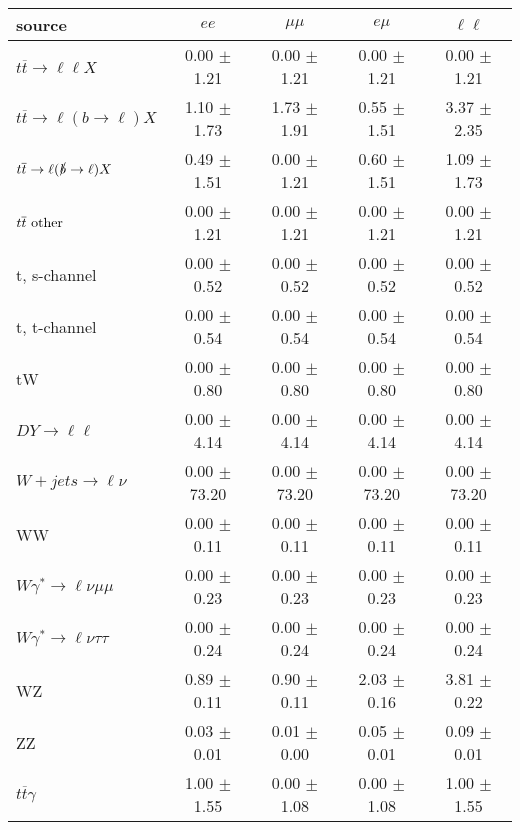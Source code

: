 \begin{tabular}{l|cccc} \hline\hline
source & $ee$ & $\mu\mu$ & $e\mu$ & $\ell\ell $ \\
\hline
$t\overline{t} \rightarrow \ell \ell X$ &  0.00 $\pm$  1.21 &  0.00 $\pm$  1.21 &  0.00 $\pm$  1.21 &  0.00 $\pm$  1.21 \\
$t\overline{t} \rightarrow \ell (b \rightarrow \ell) X$ &  1.10 $\pm$  1.73 &  1.73 $\pm$  1.91 &  0.55 $\pm$  1.51 &  3.37 $\pm$  2.35 \\
$t\overline{t} \rightarrow \ell (\slashed b \rightarrow \ell) X$ &  0.49 $\pm$  1.51 &  0.00 $\pm$  1.21 &  0.60 $\pm$  1.51 &  1.09 $\pm$  1.73 \\
        $t\overline{t}\ \rm{other}$ &  0.00 $\pm$  1.21 &  0.00 $\pm$  1.21 &  0.00 $\pm$  1.21 &  0.00 $\pm$  1.21 \\
\hline
                       t, s-channel &  0.00 $\pm$  0.52 &  0.00 $\pm$  0.52 &  0.00 $\pm$  0.52 &  0.00 $\pm$  0.52 \\
                       t, t-channel &  0.00 $\pm$  0.54 &  0.00 $\pm$  0.54 &  0.00 $\pm$  0.54 &  0.00 $\pm$  0.54 \\
                                 tW &  0.00 $\pm$  0.80 &  0.00 $\pm$  0.80 &  0.00 $\pm$  0.80 &  0.00 $\pm$  0.80 \\
\hline
         $DY \rightarrow \ell \ell$ &  0.00 $\pm$  4.14 &  0.00 $\pm$  4.14 &  0.00 $\pm$  4.14 &  0.00 $\pm$  4.14 \\
      $W+jets \rightarrow \ell \nu$ &  0.00 $\pm$ 73.20 &  0.00 $\pm$ 73.20 &  0.00 $\pm$ 73.20 &  0.00 $\pm$ 73.20 \\
                                 WW &  0.00 $\pm$  0.11 &  0.00 $\pm$  0.11 &  0.00 $\pm$  0.11 &  0.00 $\pm$  0.11 \\
\hline
$W\gamma^{*} \rightarrow \ell \nu \mu\mu$ &  0.00 $\pm$  0.23 &  0.00 $\pm$  0.23 &  0.00 $\pm$  0.23 &  0.00 $\pm$  0.23 \\
$W\gamma^{*} \rightarrow \ell \nu \tau\tau$ &  0.00 $\pm$  0.24 &  0.00 $\pm$  0.24 &  0.00 $\pm$  0.24 &  0.00 $\pm$  0.24 \\
                                 WZ &  0.89 $\pm$  0.11 &  0.90 $\pm$  0.11 &  2.03 $\pm$  0.16 &  3.81 $\pm$  0.22 \\
                                 ZZ &  0.03 $\pm$  0.01 &  0.01 $\pm$  0.00 &  0.05 $\pm$  0.01 &  0.09 $\pm$  0.01 \\
\hline
              $t\overline{t}\gamma$ &  1.00 $\pm$  1.55 &  0.00 $\pm$  1.08 &  0.00 $\pm$  1.08 &  1.00 $\pm$  1.55 \\

\end{tabular}
